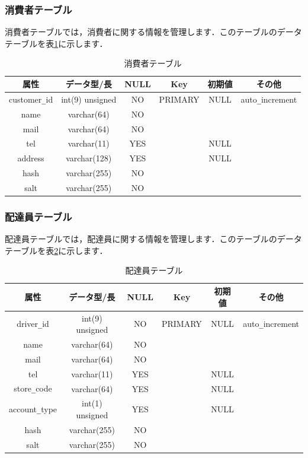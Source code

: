\documentclass[a4j,titlepage]{jarticle}
\begin{document}
\subsubsection{消費者テーブル}
消費者テーブルでは，消費者に関する情報を管理します．このテーブルのデータテーブルを表\ref{customer}に示します．
\begin{table}[htb]
  \caption{消費者テーブル}
  \label{customer}
  \begin{center}
    \begin{tabular}{|c|c|c|c|c|c|} \hline
      属性 & データ型/長 & NULL & Key & 初期値 & その他 \\ \hline \hline
      customer\verb|_|id & int(9) unsigned & NO & PRIMARY & NULL & auto\verb|_|increment\\ \hline
      name & varchar(64) & NO &   &  & \\ \hline
      mail & varchar(64) & NO &   &  & \\ \hline
      tel & varchar(11) & YES &   & NULL & \\ \hline
      address & varchar(128) & YES &   & NULL & \\ \hline
      hash & varchar(255) & NO &   &  & \\ \hline
      salt & varchar(255) & NO &   &  & \\ \hline
    \end{tabular}
  \end{center}
\end{table}
\clearpage

\subsubsection{配達員テーブル}
配達員テーブルでは，配達員に関する情報を管理します．このテーブルのデータテーブルを表\ref{driver}に示します．
\begin{table}[htb]
  \caption{配達員テーブル}
  \label{driver}
  \begin{center}
    \begin{tabular}{|c|c|c|c|c|c|} \hline
      属性 & データ型/長 & NULL & Key & 初期値 & その他 \\ \hline \hline
      driver\verb|_|id & int(9) unsigned & NO & PRIMARY & NULL & auto\verb|_|increment\\ \hline
      name & varchar(64) & NO &   &  & \\ \hline
      mail & varchar(64) & NO &  &  & \\ \hline
      tel & varchar(11) & YES &  & NULL & \\ \hline
      store\verb|_|code & varchar(64) & YES &   & NULL & \\ \hline
      account\verb|_|type & int(1) unsigned & YES &   & NULL & \\ \hline
      hash & varchar(255) & NO &   &  & \\ \hline
      salt & varchar(255) & NO &   &  & \\ \hline
    \end{tabular}
  \end{center}
\end{table}
\end{document}
